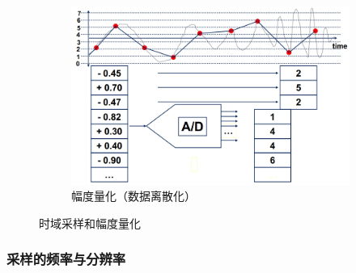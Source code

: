 \begin{figure}[H]
\begin{subfigure}{0.30\textwidth}
        \includegraphics[width=\textwidth]{chap2/img/quantize-2.png}
        \caption{幅度量化（数据离散化）}
        \label{fig:quantize-2}
    \end{subfigure}
    \caption{时域采样和幅度量化}
\end{figure}

\subsubsection{采样的频率与分辨率}

